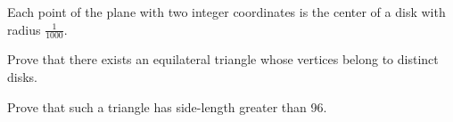 Each point of the plane with two integer coordinates is the center of a disk with radius $ \frac {1} {1000}$.

Prove that there exists an equilateral triangle whose vertices belong to distinct disks.

Prove that such a triangle has side-length greater than 96.